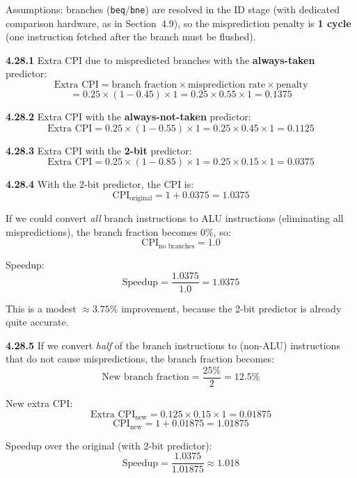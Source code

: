 Assumptions: branches (\texttt{beq}/\texttt{bne}) are resolved in the ID
stage (with dedicated comparison hardware, as in Section~4.9), so the
misprediction penalty is \textbf{1 cycle} (one instruction fetched after the
branch must be flushed).

\medskip\noindent\textbf{4.28.1}
Extra CPI due to mispredicted branches with the \textbf{always-taken}
predictor:
\[
  \text{Extra CPI} = \text{branch fraction} \times \text{misprediction rate}
    \times \text{penalty}
\]
\[
  = 0.25 \times (1 - 0.45) \times 1
  = 0.25 \times 0.55 \times 1
  = \boxed{0.1375}
\]

\medskip\noindent\textbf{4.28.2}
Extra CPI with the \textbf{always-not-taken} predictor:
\[
  \text{Extra CPI} = 0.25 \times (1 - 0.55) \times 1
  = 0.25 \times 0.45 \times 1
  = \boxed{0.1125}
\]

\medskip\noindent\textbf{4.28.3}
Extra CPI with the \textbf{2-bit} predictor:
\[
  \text{Extra CPI} = 0.25 \times (1 - 0.85) \times 1
  = 0.25 \times 0.15 \times 1
  = \boxed{0.0375}
\]

\medskip\noindent\textbf{4.28.4}
With the 2-bit predictor, the CPI is:
\[
  \text{CPI}_{\text{original}} = 1 + 0.0375 = 1.0375
\]

If we could convert \emph{all} branch instructions to ALU instructions
(eliminating all mispredictions), the branch fraction becomes 0\%, so:
\[
  \text{CPI}_{\text{no branches}} = 1.0
\]

Speedup:
\[
  \text{Speedup} = \frac{1.0375}{1.0} = \boxed{1.0375}
\]

This is a modest $\approx 3.75\%$ improvement, because the 2-bit predictor
is already quite accurate.

\medskip\noindent\textbf{4.28.5}
If we convert \emph{half} of the branch instructions to (non-ALU)
instructions that do not cause mispredictions, the branch fraction becomes:
\[
  \text{New branch fraction} = \frac{25\%}{2} = 12.5\%
\]

New extra CPI:
\[
  \text{Extra CPI}_{\text{new}} = 0.125 \times 0.15 \times 1 = 0.01875
\]
\[
  \text{CPI}_{\text{new}} = 1 + 0.01875 = 1.01875
\]

Speedup over the original (with 2-bit predictor):
\[
  \text{Speedup} = \frac{1.0375}{1.01875} \approx \boxed{1.018}
\]

